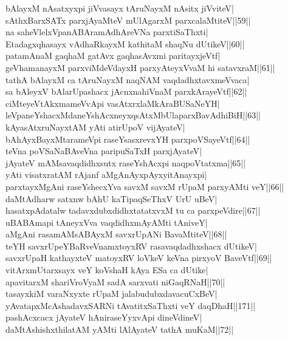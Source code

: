 \documentclass{article}
\begin{document}
bAlayxM nAsatxyxpi jiVvasayx tAruNayxM nAsitx jiVviteV|\\
sAthxBarxSATx parxjAyaMteV mUlAgarxM parxcalaMtiteV||59||\\
na saheVlelxVpanABAramAdhAreVNa parxtiSaThxti|\\
Etadagxqhasayx vAdhaRkayxM kathitaM shaqNu dUtikeV||60||\\
patamAnaM gaqhaM gatAvx gaqhasAvxmi paritayxjeVtf|\\
geVhamanayxM parxviMdeVdayxH parxyAteyxVvaM hi satavxraM||61||\\
tathA bAlayxM ca tAruNayxM naqNAM vaqdadhxtavxmeVvaca|\\
sa bAleyxV bAlarUpashacx jAcnxnahiVnaM parxkArayeVtf||62||\\
ciMteyeVtAkxmameVvApi vasAtxrxlaMkAraBUSaNeYH|\\
leVpaneYshacxMdaneYshAcxneyxqsAtxMbUlaparxBavAdhiBiH||63||\\
kAyasAtxruNayxtAM yAti atirUpoV vijAyateV|\\
bAhAyxBayxMtarameVpi raseYsasxrevxYH parxpoVSayeVtf||64||\\
teVna poVSaNaBAveVna paripuSaTxH parxjAyateV|\\
jAyateV mAMsavaqdidhxsutx raseYshAcxpi naqpoVtatxma||65||\\
yAti visatxratAM rAjanf aMgAnAyxpAyxyitAnayxpi|\\
parxtayxMgAni raseYshecxYva savxM savxM rUpaM parxyAMti veY||66||\\
daMtAdharw satxnw bAhU kaTipaqSeThxV UrU uBeV|\\
hasatxpAdatalw tadavxdubxdidhxtatatxvxM tu ca parxpeVdire||67||\\
uBABAmapi tAneyxVva vaqdidhxmAyAMti tAniveY|\\
aMgAni rasamAMsABAyxM savxrUpANi BavaMtiteV||68||\\
teYH savxrUpeYBaRveVnamxtoyxRV rasavaqdadhxshacx dUtikeV|\\
savxrUpaH kathayxteV matoyxRV loVkeV keVna pirxyoV BaveVtf||69||\\
vitArxmUtarxsayx veY koVshaH kAya ESa ca dUtike|\\
apavitarxM shariVroVyaM sadA sarxvati niGaqRNaH||70||\\
tasayxkiM varaNxyxte rUpaM jalabudubxdavacuCxBeV|\\
yAvatapxMcAshadavxSARNi tAvatitxSaThxti veY daqDhaH||171||\\
pashAcxcacx jAyateV hAniraseYyxvApi dineVdineV|\\
daMtAshishxthilatAM yAMti lAlAyateV tathA muKaM||72||\\
\end{document}
